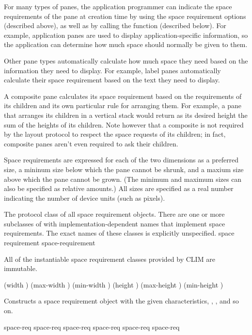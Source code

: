 For many types of panes, the application programmer can indicate the space
requirements of the pane at creation time by using the space requirement options
(described above), as well as by calling the 
function (described below).  For example, application panes are used to display
application-specific information, so the application can determine how much
space should normally be given to them.

Other pane types automatically calculate how much space they need based on the
information they need to display.  For example, label panes automatically
calculate their space requirement based on the text they need to display.

A composite pane calculates its space requirement based on the requirements of
its children and its own particular rule for arranging them.  For example, a
pane that arranges its children in a vertical stack would return as its desired
height the sum of the heights of its children.  Note however that a composite is
not required by the layout protocol to respect the space requests of its
children; in fact, composite panes aren't even required to ask their children.

Space requirements are expressed for each of the two dimensions as a preferred
size, a mininum size below which the pane cannot be shrunk, and a maxium size
above which the pane cannot be grown.  (The minimum and maximum sizes can also
be specified as relative amounts.)  All sizes are specified as a real number
indicating the number of device units (such as pixels).



The protocol class of all space requirement objects.  There are one or more
subclasses of  with implementation-dependent names that
implement space requirements.  The exact names of these classes is explicitly
unspecified.  
 {space requirement} {space-requirement}

All of the instantiable space requirement classes provided by CLIM are
immutable.


 {\key (width ) (max-width ) (min-width )
                                      (height ) (max-height ) (min-height )}

Constructs a space requirement object with the given characteristics, ,
, and so on.

             {space-req}
         {space-req}
         {space-req}
            {space-req}
        {space-req}
        {space-req}


